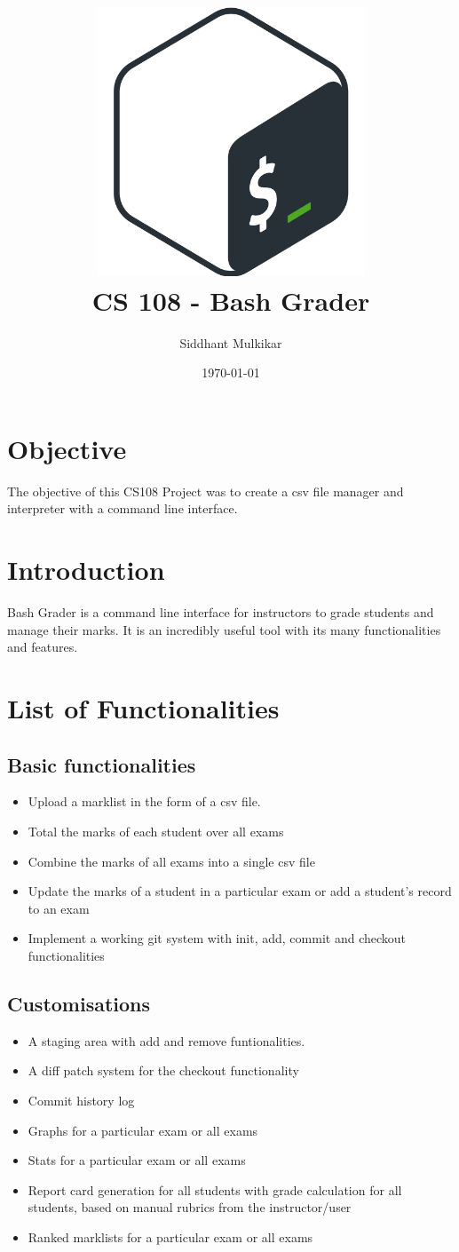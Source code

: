 \documentclass{article}
\title{\includegraphics[width=8cm]{bashlogo.png} \\[2cm] CS 108 - Bash Grader}
\author{Siddhant Mulkikar}
\date{\today}
\begin{document}
\maketitle
\newpage
\tableofcontents
\newpage

\section{Objective}
The objective of this CS108 Project was to create a csv file manager and interpreter with a command line interface.

\section{Introduction}
Bash Grader is a command line interface for instructors to grade students and manage their marks. It is an incredibly useful tool with its many functionalities and features. 

\section{List of Functionalities}
\subsection{Basic functionalities}
\begin{itemize}
    \item Upload a marklist in the form of a csv file.
    \item Total the marks of each student over all exams
    \item Combine the marks of all exams into a single csv file
    \item Update the marks of a student in a particular exam or add a student's record to an exam
    \item Implement a working git system with init, add, commit and checkout functionalities
\end{itemize}
\subsection{Customisations}
\begin{itemize}
    \item A staging area with add and remove funtionalities.
    \item A diff patch system for the checkout functionality
    \item Commit history log
    \item Graphs for a particular exam or all exams
    \item Stats for a particular exam or all exams
    \item Report card generation for all students with grade calculation for all students, based on manual rubrics from the instructor/user
    \item Ranked marklists for a particular exam or all exams
\end{itemize}
\newpage
\end{document}
